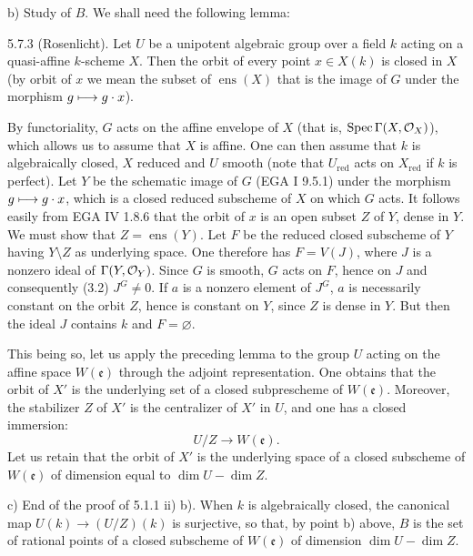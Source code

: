 \noindent b) Study of $B$. We shall need the following lemma:
\begin{lemma}{5.7.3}\label{XVII.5.7.3}
(Rosenlicht). Let $U$ be a unipotent algebraic group over a field $k$ acting on a quasi-affine $k$-scheme $X$. Then the orbit of every point $x\in X(k)$ is closed in $X$ (by orbit of $x$ we mean the subset of $\operatorname{ens}(X)$ that is the image of $G$ under the morphism $g\longmapsto g\cdot x$).
\end{lemma}
By functoriality, $G$ acts on the affine envelope of $X$ (that is, $\operatorname{Spec}\Gamma(X,\mathcal{O}_X)$), which allows us to assume that $X$ is affine. One can then assume that $k$ is algebraically closed, $X$ reduced and $U$ smooth (note that $U_{\mathrm{red}}$ acts on $X_{\mathrm{red}}$ if $k$ is perfect). Let $Y$ be the schematic image of $G$ (EGA I 9.5.1) under the morphism $g\longmapsto g\cdot x$, which is a closed reduced subscheme of $X$ on which $G$ acts. It follows easily from EGA IV 1.8.6 that the orbit of $x$ is an open subset $Z$ of $Y$, dense in $Y$. We must show that $Z=\operatorname{ens}(Y)$. Let $F$ be the reduced closed subscheme of $Y$ having $Y\setminus Z$ as underlying space. One therefore has $F=V(J)$, where $J$ is a nonzero ideal of $\Gamma(Y,\mathcal{O}_Y)$. Since $G$ is smooth, $G$ acts on $F$, hence on $J$ and consequently (3.2) $J^G\ne0$. If $a$ is a nonzero element of $J^G$, $a$ is necessarily constant on the orbit $Z$, hence is constant on $Y$, since $Z$ is dense in $Y$. But then the ideal $J$ contains $k$ and $F=\varnothing$.

This being so, let us apply the preceding lemma to the group $U$ acting on the affine space $W(\mathfrak e)$ through the adjoint representation. One obtains that the orbit of $X'$ is the underlying set of a closed subprescheme of $W(\mathfrak e)$. Moreover, the stabilizer $Z$ of $X'$ is the centralizer of $X'$ in $U$, and one has a closed immersion:
\[
 U/Z\to W(\mathfrak e).
\]
Let us retain that the orbit of $X'$ is the underlying space of a closed subscheme of $W(\mathfrak e)$ of dimension equal to $\dim U-\dim Z$.

\noindent c) End of the proof of 5.1.1 ii) b). When $k$ is algebraically closed, the canonical map $U(k)\to(U/Z)(k)$ is surjective, so that, by point b) above, $B$ is the set of rational points of a closed subscheme of $W(\mathfrak e)$ of dimension $\dim U-\dim Z$.
